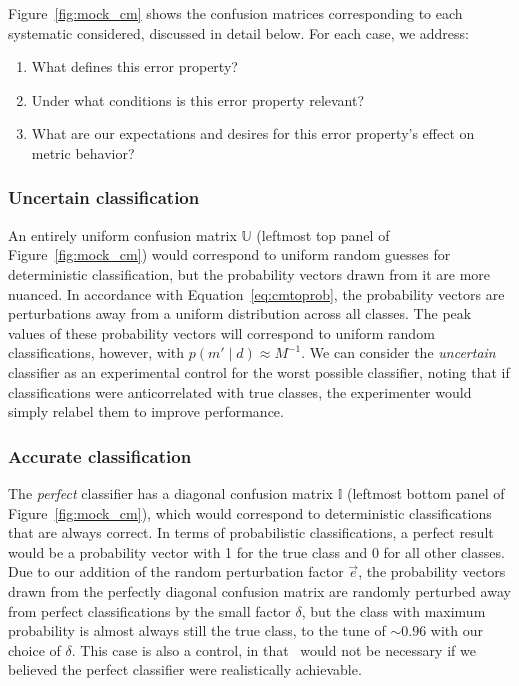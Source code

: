 Figure~\ref{fig:mock_cm} shows the confusion matrices corresponding to each systematic considered, discussed in detail below.
For each case, we address:
\begin{enumerate}
  \item What defines this error property?
  \item Under what conditions is this error property relevant?
  \item What are our expectations and desires for this error property's effect on metric behavior?
\end{enumerate}

\subsubsection{Uncertain classification}
\label{sec:uncertaindata}

An entirely uniform confusion matrix $\mathbb{U}$ (leftmost top panel of Figure~\ref{fig:mock_cm}) would correspond to uniform random guesses for deterministic classification, but the probability vectors drawn from it are more nuanced.
In accordance with Equation~\ref{eq:cmtoprob}, the probability vectors are perturbations away from a uniform distribution across all classes.
The peak values of these probability vectors will correspond to uniform random classifications, however, with $p(m' \mid d)\approx M^{-1}$.
We can consider the \textit{uncertain} classifier as an experimental control for the worst possible classifier, noting that if classifications were anticorrelated with true classes, the experimenter would simply relabel them to improve performance.

\subsubsection{Accurate classification}
\label{sec:accuratedata}

The \textit{perfect} classifier has a diagonal confusion matrix $\mathbb{I}$ (leftmost bottom panel of Figure~\ref{fig:mock_cm}), which would correspond to deterministic classifications that are always correct.
In terms of probabilistic classifications, a perfect result would be a probability vector with 1 for the true class and 0 for all other classes.
Due to our addition of the random perturbation factor $\vec{e}$, the probability vectors drawn from the perfectly diagonal confusion matrix are randomly perturbed away from perfect classifications by the small factor $\delta$, but the class with maximum probability is almost always still the true class, to the tune of $\sim0.96$ with our choice of $\delta$.
This case is also a control, in that \plasticc\ would not be necessary if we believed the perfect classifier were realistically achievable.

